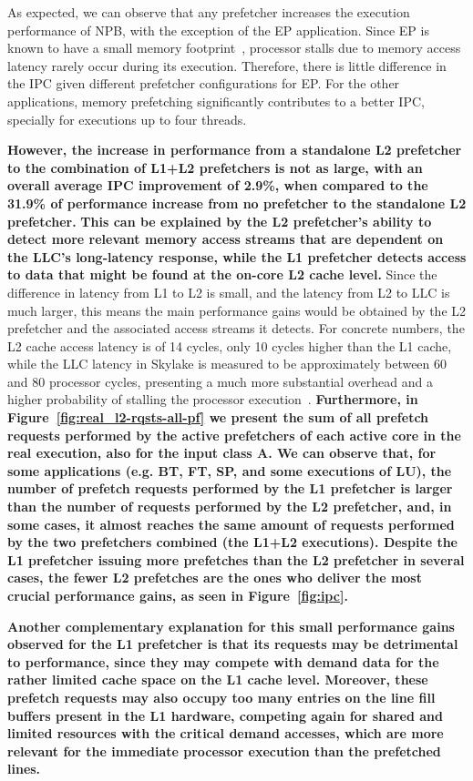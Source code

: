 \documentclass[AMA,final,STIX1COL]{WileyNJD-v2}
\newcommand\new[1]{{\color{red}\textbf{#1}}}
\begin{document}
As expected, we can observe that any prefetcher increases the execution performance of NPB, with the exception of the EP application. 
Since EP is known to have a small memory footprint~\cite{jin1999openmp}, processor stalls due to memory access latency rarely occur during its execution. 
Therefore, there is little difference in the IPC given different prefetcher configurations for EP. 
For the other applications, memory prefetching significantly contributes to a better IPC, specially for executions up to four threads.

\new{However, the increase in performance from a standalone L2 prefetcher to the combination of L1+L2 prefetchers is not as large, with an overall average IPC improvement of 2.9\%, when compared to the 31.9\% of performance increase from no prefetcher to the standalone L2 prefetcher.}
\new{This can be explained by the L2 prefetcher's ability to detect more relevant memory access streams that are dependent on the LLC's long-latency response, while the L1 prefetcher detects access to data that might be found at the on-core L2 cache level.}
Since the difference in latency from L1 to L2 is small, and the latency from L2 to LLC is much larger, this means the main performance gains would be obtained by the L2 prefetcher and the associated access streams it detects.
For concrete numbers, the L2 cache access latency is of 14 cycles, only 10 cycles higher than the L1 cache, while the LLC latency in Skylake is measured to be approximately between 60 and 80 processor cycles, presenting a much more substantial overhead and a higher probability of stalling the processor execution~\cite{alves2015sinuca}. 
\new{Furthermore, in Figure~\ref{fig:real_l2-rqsts-all-pf} we present the sum of all prefetch requests performed by the active prefetchers of each active core in the real execution, also for the input class A.
We can observe that, for some applications (e.g. BT, FT, SP, and some executions of LU), the number of prefetch requests performed by the L1 prefetcher is larger than the number of requests performed by the L2 prefetcher, and, in some cases, it almost reaches the same amount of requests performed by the two prefetchers combined (the L1+L2 executions).
Despite the L1 prefetcher issuing more prefetches than the L2 prefetcher in several cases, the fewer L2 prefetches are the ones who deliver the most crucial performance gains, as seen in Figure~\ref{fig:ipc}.}

\new{Another complementary explanation for this small performance gains observed for the L1 prefetcher is that its requests may be detrimental to performance, since they may compete with demand data for the rather limited cache space on the L1 cache level.
Moreover, these prefetch requests may also occupy too many entries on the line fill buffers present in the L1 hardware, competing again for shared and limited resources with the critical demand accesses, which are more relevant for the immediate processor execution than the prefetched lines.}
\end{document}
